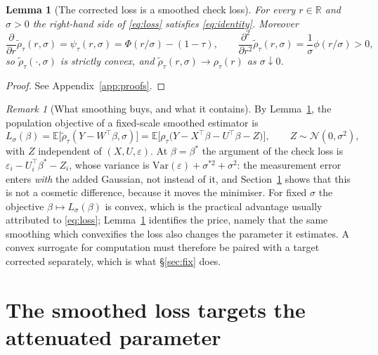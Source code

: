 \documentclass[12pt,a4paper]{article}
\newtheorem{lemma}[theorem]{Lemma}
\theoremstyle{definition}
\theoremstyle{remark}
\newtheorem{remark}[theorem]{Remark}
\newcommand{\R}{\mathbb{R}}
\newcommand{\E}{\mathbb{E}}
\newcommand{\cN}{\mathcal{N}}
\newcommand{\rht}{\tilde{\rho}_\tau}
\newcommand{\psit}{\psi_\tau}
\newcommand{\betas}{\beta^*}
\begin{document}
\begin{lemma}[The corrected loss is a smoothed check loss]
\label{lem:identity}
For every $r\in\R$ and $\sigma>0$ the right-hand side of \eqref{eq:loss} satisfies
\eqref{eq:identity}. Moreover
\begin{equation}
\frac{\partial}{\partial r}\rht(r,\sigma) = \psit(r,\sigma) = \Phi(r/\sigma)-(1-\tau),
\qquad
\frac{\partial^2}{\partial r^2}\rht(r,\sigma) = \frac{1}{\sigma}\phi(r/\sigma) > 0 ,
\end{equation}
so $\rht(\cdot,\sigma)$ is strictly convex, and $\rht(r,\sigma)\to\rho_\tau(r)$ as
$\sigma\downarrow0$.
\end{lemma}

\begin{proof}
See Appendix~\ref{app:proofs}.
\end{proof}

\begin{remark}[What smoothing buys, and what it contains]
\label{rem:double}
By Lemma~\ref{lem:identity}, the population objective of a fixed-scale smoothed
estimator is
\begin{equation}
L_\sigma(\beta) = \E\big[\rht(Y-W^\top\beta,\sigma)\big]
= \E\big[\rho_\tau\big(Y-X^\top\beta-U^\top\beta-Z\big)\big],
\qquad Z\sim\cN(0,\sigma^2),
\label{eq:double}
\end{equation}
with $Z$ independent of $(X,U,\varepsilon)$. At $\beta=\betas$ the argument of the check loss is
$\varepsilon_i - U_i^\top\betas - Z_i$, whose variance is
$\mathrm{Var}(\varepsilon)+\sigma^{*2}+\sigma^2$: the measurement error enters \emph{with}
the added Gaussian, not instead of it, and Section~\ref{sec:negative} shows that this is not
a cosmetic difference, because it moves the minimiser. For fixed $\sigma$ the objective
$\beta\mapsto L_\sigma(\beta)$ is convex, which is the practical advantage usually attributed
to \eqref{eq:loss}; Lemma~\ref{lem:identity} identifies the price, namely that the same
smoothing which convexifies the loss also changes the parameter it estimates. A convex
surrogate for computation must therefore be paired with a target corrected separately, which
is what \S\ref{sec:fix} does.
\end{remark}

\section{The smoothed loss targets the attenuated parameter}
\label{sec:negative}
\end{document}
